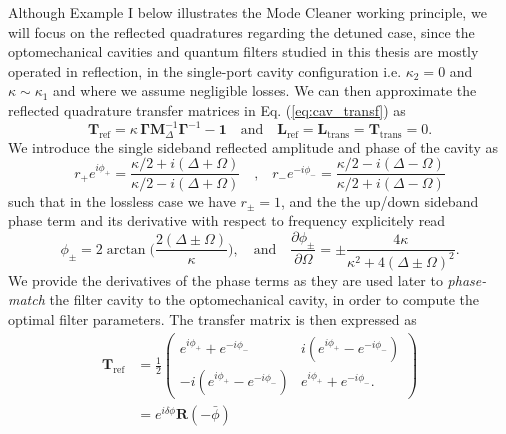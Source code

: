 Although Example I below illustrates the Mode Cleaner working principle, we will focus on the reflected quadratures regarding the detuned case, since the optomechanical cavities and quantum filters studied in this thesis are mostly operated in reflection, in the single-port cavity configuration i.e. $\kappa_2 = 0$ and $\kappa \sim \kappa_1$ and where we assume negligible losses. We can then approximate the reflected quadrature transfer matrices in Eq. (\ref{eq:cav_transf}) as
\begin{equation}
      \mathbf{T}_{\mathrm{ref}} = \kappa \, \mathbf{\Gamma} \mathbf{M}^{-1}_\Delta \mathbf{\Gamma}^{-1}- \mathbf{1}  \quad \text{and} \quad 
      \mathbf{L}_{\mathrm{ref}}  =  \mathbf{L}_{\mathrm{trans}} = \mathbf{T}_{\mathrm{trans}} = 0.
\end{equation}
We introduce the single sideband reflected amplitude and phase of the cavity as
\begin{equation*}
  r_+ e^{i \phi_+} = \frac{\kappa/2 + i(\Delta + \Omega)}{\kappa/2 - i(\Delta + \Omega)} \quad \text{,} \quad r_- e^{-i \phi_-} = \frac{\kappa/2 - i(\Delta - \Omega)}{\kappa/2 + i(\Delta - \Omega)} 
\end{equation*}
such that in the lossless case we have $r_\pm = 1$, and the the up/down sideband phase term and its derivative with respect to frequency explicitely read
\begin{equation}
    \phi_{\pm} = 2 \arctan\Bigg(\frac{2(\Delta \pm \Omega)}{\kappa}\Bigg), \quad \text{and} \quad
  \dfrac{\partial \phi_\pm}{\partial \Omega} = \pm \dfrac{4\kappa}{\kappa^2 + 4(\Delta \pm \Omega)^2}.
\end{equation}
We provide the derivatives of the phase terms as they are used later to \textit{phase-match} the filter cavity to the optomechanical cavity, in order to compute the optimal filter parameters. The transfer matrix is then expressed as 
\begin{equation}
\begin{split}
      \mathbf{T}_{\mathrm{ref}} & = \frac{1}{2}\begin{pmatrix}
        e^{i \phi_+} + e^{-i \phi_-} & i (e^{i \phi_+} - e^{-i \phi_-}) \\
        -i (e^{i \phi_+} - e^{-i \phi_-}) & e^{i \phi_+} + e^{-i \phi_-}.
      \end{pmatrix} \\
      & = e^{i\delta \phi} \mathbf{R}\left(- \bar \phi \right)
\end{split}
\label{eq:ideal_FC}
\end{equation}

